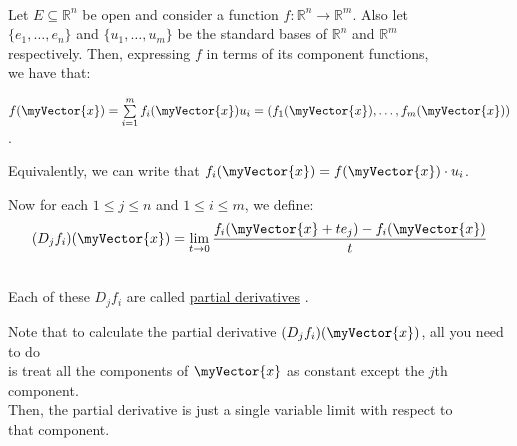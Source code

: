 \documentclass{book}
\newcommand{\teachComment}{
   \color{Orange}%
   \fontsize{12}{14}\selectfont%
}
\newenvironment{myTindent}{%
   \begin{adjustwidth}{7.5em}{0em}%
}{%
   \end{adjustwidth}%
}
\newcommand{\udefine}[1]{{%
   \setulcolor{Red}%
   \setul{0.14em}{0.07em}%
   \ul{#1}%
}}
\newcommand{\mySepTwo}[1][.]{%
   {\noindent\color{#1}{\rule{6.5in}{0.5mm}}}\\%
}
\newcommand{\retTwo}{\hfill\bigbreak}
\newcommand{\mVec}[1]{\myVector{#1}}
\begin{document}
\mySepTwo

Let $E \subseteq \mathbb{R}^n$ be open and consider a function $f: \mathbb{R}^n \longrightarrow \mathbb{R}^m$. Also let\\ $\{e_1, \ldots, e_n\}$ and $\{u_1, \ldots, u_m\}$ be the standard bases of $\mathbb{R}^n$ and $\mathbb{R}^m$\\ respectively. Then, expressing $f$ in terms of its component functions,\\ we have that:

{\centering $f(\mVec{x}) = \sum\limits_{i=1}^mf_{i}(\mVec{x})u_i = (f_1(\mVec{x}), \ldots, f_m(\mVec{x}))$.\retTwo\par}

Equivalently, we can write that $f_i(\mVec{x}) = f(\mVec{x}) \cdot u_i$.\retTwo

Now for each $1 \leq j \leq n$ and $1 \leq i \leq m$, we define:\\ [-26pt]

\[(D_jf_i)(\mVec{x}) = \lim\limits_{t\rightarrow 0}\frac{f_i(\mVec{x} + te_j) - f_i(\mVec{x})}{t}\]

\phantom{.}\\Each of these $D_jf_i$ are called \udefine{partial derivatives}.\retTwo


\begin{myTindent}\teachComment
   Note that to calculate the partial derivative $(D_jf_i)(\mVec{x})$, all you need to do\\ is treat all the components of $\mVec{x}$ as constant except the $j$th component.\\ Then, the partial derivative is just a single variable limit with respect to\\ that component.\retTwo
\end{myTindent}
\end{document}

